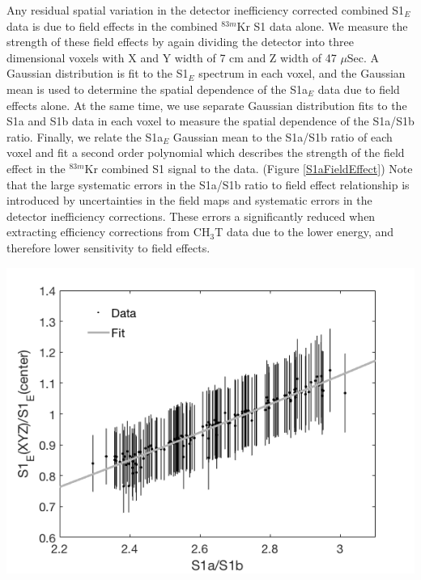 Any residual spatial variation in the detector inefficiency corrected combined S1$_E$ data is due to field effects in the combined $^{83m}$Kr S1 data alone.  We measure the strength of these field effects by again dividing the detector into three dimensional voxels with X and Y width of 7 cm and Z width of 47 $\mu$Sec.  A Gaussian distribution is fit to the S1$_E$ spectrum in each voxel, and the Gaussian mean is used to determine the spatial dependence of the S1a$_E$ data due to field effects alone.  At the same time, we use separate Gaussian distribution fits to the S1a and S1b data in each voxel to measure the spatial dependence of the S1a/S1b ratio.  Finally, we relate the S1a$_E$ Gaussian mean to the S1a/S1b ratio of each voxel and fit a second order polynomial which describes the strength of the field effect in the $^{83m}$Kr combined S1 signal to the data. (Figure \ref{S1aFieldEffect}) Note that the large systematic errors in the S1a/S1b ratio to field effect relationship is introduced by uncertainties in the field maps and systematic errors in the detector inefficiency corrections.  These errors a significantly reduced when extracting efficiency corrections from CH$_3$T data due to the lower energy, and therefore lower sensitivity to field effects.

\begin{minipage}{8.15cm}
\begin{center}
\includegraphics[scale=0.4]{figures/MatthewS1FieldEffectMeasurement.png}
\label{S1aFieldEffect}
\end{center}
\end{minipage}

